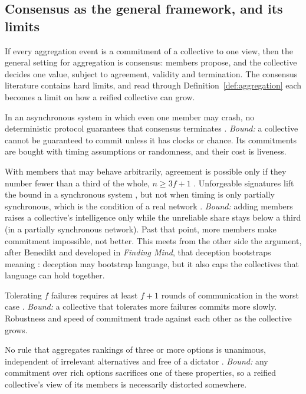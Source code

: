 \documentclass[11pt,a4paper]{article}
\begin{document}
\subsection{Consensus as the general framework, and its limits}\label{sec:consensus}

If every aggregation event is a commitment of a collective to one view, then the general setting
for aggregation is consensus: members propose, and the collective decides one value, subject to
agreement, validity and termination. The consensus literature contains hard limits, and read
through Definition~\ref{def:aggregation} each becomes a limit on how a reified collective can grow.

\begin{description}[leftmargin=1.2em,itemsep=4pt,font=\normalfont\spartansemi]
\item[Asynchrony (Fischer, Lynch and Paterson).] In an asynchronous system in which even one member
  may crash, no deterministic protocol guarantees that consensus terminates \cite{flp}.
  \emph{Bound:} a collective cannot be guaranteed to commit unless it has clocks or chance. Its
  commitments are bought with timing assumptions or randomness, and their cost is liveness.
\item[Deception (Lamport, Shostak and Pease).] With members that may behave arbitrarily, agreement is
  possible only if they number fewer than a third of the whole, $n \ge 3f+1$ \cite{byzantine}.
  Unforgeable signatures lift the bound in a synchronous system \cite{dolevstrong}, but not when
  timing is only partially synchronous, which is the condition of a real network
  \cite{dls}.
  \emph{Bound:} adding members raises a collective's intelligence only while the unreliable share
  stays below a third (in a partially synchronous network). Past that point, more members make commitment impossible, not better. This
  meets from the other side the argument, after Benedikt and developed in \emph{Finding Mind}, that
  deception bootstraps meaning \cite{benedikt,findingmind}: deception may bootstrap language, but it
  also caps the collectives that language can hold together.
\item[Time (Fischer and Lynch; Dolev and Strong).] Tolerating $f$ failures requires at least $f+1$
  rounds of communication in the worst case \cite{fischerlynch,dolevstrong}. \emph{Bound:} a
  collective that tolerates more failures commits more slowly. Robustness and speed of commitment
  trade against each other as the collective grows.
\item[Fidelity (Arrow).] No rule that aggregates rankings of three or more options is unanimous,
  independent of irrelevant alternatives and free of a dictator \cite{arrow}. \emph{Bound:} any
  commitment over rich options sacrifices one of these properties, so a reified collective's view
  of its members is necessarily distorted somewhere.
\end{description}
\end{document}
